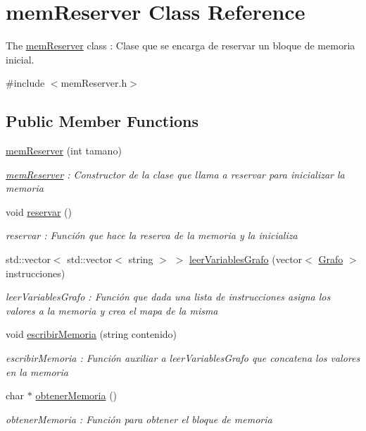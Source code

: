\hypertarget{classmem_reserver}{}\section{mem\+Reserver Class Reference}
\label{classmem_reserver}


The \hyperlink{classmem_reserver}{mem\+Reserver} class \+: Clase que se encarga de reservar un bloque de memoria inicial.  




{\ttfamily \#include $<$mem\+Reserver.\+h$>$}

\subsection*{Public Member Functions}
\begin{DoxyCompactItemize}
\item 
\hyperlink{classmem_reserver_a3c9bfe21a1b73d23ab0b5d2141279b3f}{mem\+Reserver} (int tamano)
\begin{DoxyCompactList}\small\item\em \hyperlink{classmem_reserver}{mem\+Reserver} \+: Constructor de la clase que llama a reservar para inicializar la memoria \end{DoxyCompactList}\item 
void \hyperlink{classmem_reserver_a7969fa416646d9d2191cc6d941a84c63}{reservar} ()\hypertarget{classmem_reserver_a7969fa416646d9d2191cc6d941a84c63}{}\label{classmem_reserver_a7969fa416646d9d2191cc6d941a84c63}

\begin{DoxyCompactList}\small\item\em reservar \+: Función que hace la reserva de la memoria y la inicializa \end{DoxyCompactList}\item 
std\+::vector$<$ std\+::vector$<$ string $>$ $>$ \hyperlink{classmem_reserver_a397f43504a4d2eef83dfe2364a6d3f97}{leer\+Variables\+Grafo} (vector$<$ \hyperlink{class_grafo}{Grafo} $>$ instrucciones)
\begin{DoxyCompactList}\small\item\em leer\+Variables\+Grafo \+: Función que dada una lista de instrucciones asigna los valores a la memoria y crea el mapa de la misma \end{DoxyCompactList}\item 
void \hyperlink{classmem_reserver_af2a2a798e616b7ff5c0d7afc7f5980fb}{escribir\+Memoria} (string contenido)
\begin{DoxyCompactList}\small\item\em escribir\+Memoria \+: Función auxiliar a leer\+Variables\+Grafo que concatena los valores en la memoria \end{DoxyCompactList}\item 
char $\ast$ \hyperlink{classmem_reserver_ac6caa7be462f14df57a9ce9568bbf6d1}{obtener\+Memoria} ()
\begin{DoxyCompactList}\small\item\em obtener\+Memoria \+: Función para obtener el bloque de memoria \end{DoxyCompactList}\end{DoxyCompactItemize}


